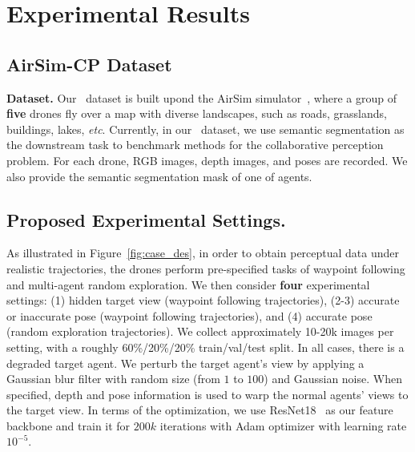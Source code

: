 

\section{Experimental Results}
\label{sec:result}
% 

\subsection{AirSim-CP Dataset}
\textbf{Dataset.} Our \DatasetName~dataset is built upond the AirSim simulator~\cite{airsim2017fsr}, where a group of \textbf{five} drones fly over a map with diverse landscapes, such as roads, grasslands, buildings, lakes, \textit{etc}. 
Currently, in our \DatasetName~dataset, we use  semantic segmentation as the downstream task to benchmark methods for the collaborative perception problem. 
For each drone, RGB images, depth images, and poses are recorded. We also provide the semantic segmentation mask of one of agents. 

\subsection{Proposed Experimental Settings.}
\label{sec:setting}
As illustrated in Figure~\ref{fig:case_des}, in order to obtain perceptual data under realistic trajectories, the drones perform pre-specified tasks of waypoint following and multi-agent random exploration. 
We then consider \textbf{four} experimental settings: (1) hidden target view (waypoint following trajectories), (2-3) accurate or inaccurate pose (waypoint following trajectories), and (4) accurate pose (random exploration trajectories). We collect approximately 10-20k images per setting, with a roughly 60\%/20\%/20\% train/val/test split.
In all cases, there is a degraded target agent. 
We perturb the target agent's view by applying a Gaussian blur filter with random size (from $1$ to $100$) and Gaussian noise.
When specified, depth and pose information is used to warp the normal agents' views to the target view. In terms of the optimization, we use ResNet18~\cite{he2016deep} as our feature backbone and train it for $200k$ iterations with Adam optimizer with learning rate $10^{-5}$.
                                
